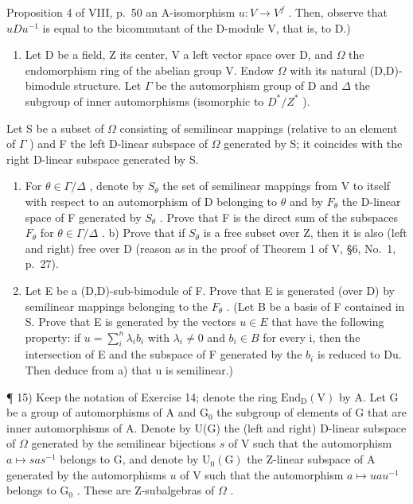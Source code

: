 Proposition 4 of VIII, p.~50 an A-isomorphism \(u: V \to V^{f}\) . Then, observe that \(uDu^{-1}\) is equal to the bicommutant of the D-module V, that is, to D.)

\begin{enumerate}
\def\labelenumi{\arabic{enumi})}
\setcounter{enumi}{13}
\tightlist
\item
  Let D be a field, Z its center, V a left vector space over D, and \(\Omega\) the endomorphism ring of the abelian group V. Endow \(\Omega\) with its natural (D,D)-bimodule structure. Let \(\Gamma\) be the automorphism group of D and \(\Delta\) the subgroup of inner automorphisms (isomorphic to \(D^{*}/Z^{*}\) ).
\end{enumerate}

Let S be a subset of \(\Omega\) consisting of semilinear mappings (relative to an element of \(\Gamma\) ) and F the left D-linear subspace of \(\Omega\) generated by S; it coincides with the right D-linear subspace generated by S.

\begin{enumerate}
\def\labelenumi{\alph{enumi})}
\item
  For \(\theta \in \Gamma / \Delta\) , denote by \(S_{\theta}\) the set of semilinear mappings from V to itself with respect to an automorphism of D belonging to \(\theta\) and by \(F_{\theta}\) the D-linear space of F generated by \(S_{\theta}\) . Prove that F is the direct sum of the subspaces \(F_{\theta}\) for \(\theta \in \Gamma / \Delta\) . b) Prove that if \(S_{\theta}\) is a free subset over Z, then it is also (left and right) free over D (reason as in the proof of Theorem 1 of V, §6, No.~1, p.~27).
\item
  Let E be a (D,D)-sub-bimodule of F. Prove that E is generated (over D) by semilinear mappings belonging to the \(F_{\theta}\) . (Let B be a basis of F contained in S. Prove that E is generated by the vectors \(u \in E\) that have the following property: if \(u = \sum_{i}^{n} \lambda_{i} b_{i}\) with \(\lambda_{i} \neq 0\) and \(b_{i} \in B\) for every i, then the intersection of E and the subspace of F generated by the \(b_{i}\) is reduced to Du. Then deduce from a) that u is semilinear.)
\end{enumerate}

¶ 15) Keep the notation of Exercise 14; denote the ring \(\mathrm{End}_{\mathrm{D}}(\mathrm{V})\) by A. Let G be a group of automorphisms of A and \(\mathrm{G}_0\) the subgroup of elements of G that are inner automorphisms of A. Denote by U(G) the (left and right) D-linear subspace of \(\Omega\) generated by the semilinear bijections \(s\) of V such that the automorphism \(a \mapsto sas^{-1}\) belongs to G, and denote by \(\mathrm{U}_0(\mathrm{G})\) the Z-linear subspace of A generated by the automorphisms \(u\) of V such that the automorphism \(a \mapsto uau^{-1}\) belongs to \(\mathrm{G}_0\) . These are Z-subalgebras of \(\Omega\) .

